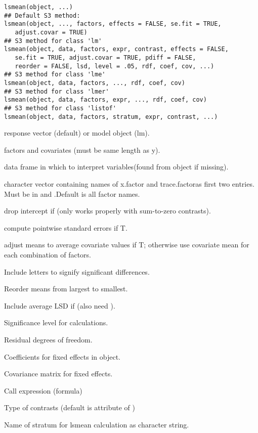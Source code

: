 \documentclass[a4paper]{book}
\begin{document}
%
\begin{Usage}
\begin{verbatim}
lsmean(object, ...)
## Default S3 method:
lsmean(object, ..., factors, effects = FALSE, se.fit = TRUE,
   adjust.covar = TRUE)
## S3 method for class 'lm'
lsmean(object, data, factors, expr, contrast, effects = FALSE,
   se.fit = TRUE, adjust.covar = TRUE, pdiff = FALSE, 
   reorder = FALSE, lsd, level = .05, rdf, coef, cov, ...)
## S3 method for class 'lme'
lsmean(object, data, factors, ..., rdf, coef, cov)
## S3 method for class 'lmer'
lsmean(object, data, factors, expr, ..., rdf, coef, cov)
## S3 method for class 'listof'
lsmean(object, data, factors, stratum, expr, contrast, ...)
\end{verbatim}
\end{Usage}
%
\begin{Arguments}
\begin{ldescription}
\item[\code{object}] response vector (default) or model object (lm).
\item[\code{...}] factors and covariates (must be same length as y).
\item[\code{data}] data frame in which to interpret variables(found from
object if missing).
\item[\code{factors}] character vector containing names of x.factor and
trace.factoras first two entries.  Must be in  and
.Default is all factor names.
\item[\code{effects}] drop intercept if  (only works properly with
sum-to-zero contrasts).
\item[\code{se.fit}] compute pointwise standard errors if T.
\item[\code{adjust.covar}] adjust means to average covariate values if
T; otherwise use covariate mean for each combination of
factors.
\item[\code{pdiff}] Include letters to signify significant differences.
\item[\code{reorder}] Reorder means from largest to smallest.
\item[\code{lsd}] Include average LSD if  (also need ).
\item[\code{level}] Significance level for  calculations.
\item[\code{rdf}] Residual degrees of freedom.
\item[\code{coef}] Coefficients for fixed effects in object.
\item[\code{cov}] Covariance matrix for fixed effects.
\item[\code{expr}] Call expression (formula)
\item[\code{contrast}] Type of contrasts (default is attribute
 of )
\item[\code{stratum}] Name of stratum for lsmean calculation as character string.
\end{ldescription}
\end{Arguments}
\end{document}
